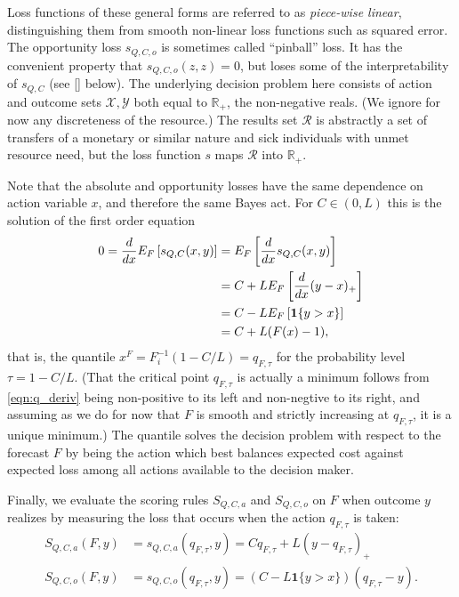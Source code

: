 \documentclass{article}
\begin{document}
Loss functions of these general forms are referred to as \emph{piece-wise linear}, distinguishing them from smooth non-linear loss functions such as squared error. The opportunity loss $s_{Q,C,o}$ is sometimes called ``pinball'' loss. It has the convenien{}t 
{}property that $s_{Q,C,o}(z,z)=0$, but loses some of the interpretability of $s_{Q,C}$ (see \ref{} below).
The underlying decision problem here consists of action and outcome sets $\mathcal{X},\mathcal{Y}$ both equal to $\mathbb{R}_+$, the non-negative reals.  (We ignore for now any discreteness of the resource.) The results set $\mathcal{R}$ is abstractly a set of transfers of a monetary or similar nature and sick individuals with unmet resource need, but the loss function $s$ maps $\mathcal{R}$ into $\mathbb{R}_+$. 

Note that the absolute and opportunity losses have the same dependence on action variable $x$, and therefore the same Bayes act. For $C \in (0,L)$ this is the solution of the first order equation 
\begin{align}{}
0 = \frac{d {} }{d {x}} E_F\left[s_{Q,C}(x,y)\right] &= E_F\left[\frac{d {} }{d {x}}s_{Q,C}(x,y)\right] \\
&= C + LE_F\left[\frac{d {} }{d {x}}(y-x)_+\right] \\
&= C - LE_F\left[\mathbf{1}\{y > x\}\right] \\
&= C + L(F(x) - 1), \label{eqn:q_deriv}
\end{align}
that is, the quantile $x^F = F_i^{-1}(1 - C/L) = q_{F,\tau}$ for the probability level $\tau = 1-C/L$. (That the critical point $q_{F,\tau}$ is actually a minimum follows from \eqref{eqn:q_deriv} being non-positive to its left and non-negtive to its right, and assuming as we do for now that $F$ is smooth and strictly increasing at $q_{F,\tau}$, it is a unique minimum.) The quantile solves the decision problem with respect to the forecast $F$ by being the action which best balances expected cost against expected loss among all actions available to the decision maker. 

Finally, we evaluate the scoring rules $S_{Q,C,a}$ and $S_{Q,C,o}$ on $F$ when outcome $y$ realizes by measuring the loss that occurs when the action $q_{F,\tau}$ is taken:
\begin{align}
S_{Q,C,a}(F,y) &= s_{Q,C,a}(q_{F,\tau}, y) = Cq_{F,\tau} + L(y- q_{F,\tau})_{+} \\
S_{Q,C,o}(F,y) &= s_{Q,C,o}(q_{F,\tau}, y) = (C - L \mathbf{1}\{y > x\})(q_{F,\tau}-y).
\end{align}
\end{document}
